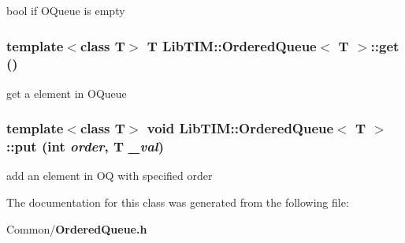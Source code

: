bool if OQueue is empty 

\subsubsection{\setlength{\rightskip}{0pt plus 5cm}template$<$class T$>$ T {\bf Lib\-TIM::Ordered\-Queue}$<$ T $>$::get ()\hspace{0.3cm}{\tt  [inline]}}\label{classLibTIM_1_1OrderedQueue_a3}


get a element in OQueue 

\subsubsection{\setlength{\rightskip}{0pt plus 5cm}template$<$class T$>$ void {\bf Lib\-TIM::Ordered\-Queue}$<$ T $>$::put (int {\em order}, T {\em \_\-val})\hspace{0.3cm}{\tt  [inline]}}\label{classLibTIM_1_1OrderedQueue_a2}


add an element in OQ with specified order 



The documentation for this class was generated from the following file:\begin{CompactItemize}
\item 
Common/{\bf Ordered\-Queue.h}\end{CompactItemize}

